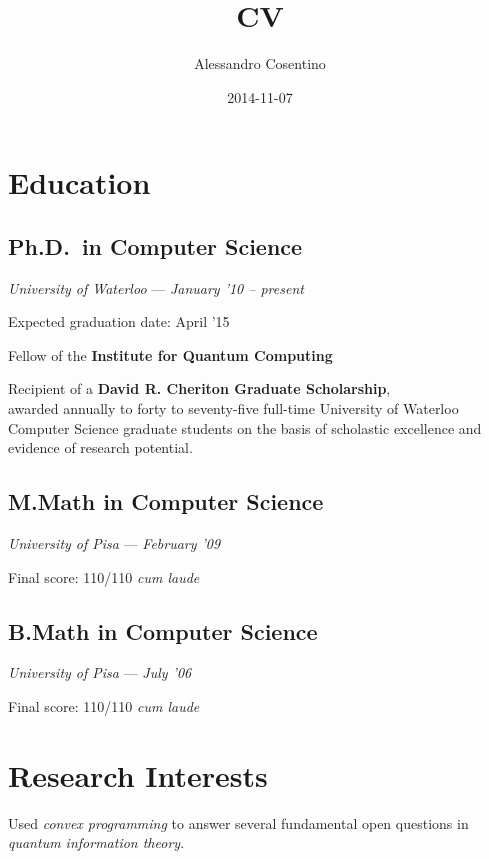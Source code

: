 \documentclass[]{article}
\title{CV}
\author{Alessandro Cosentino}
\date{2014-11-07}
\begin{document}
\maketitle
\thispagestyle{empty}

\section{Education}\label{education}

\subsection{Ph.D.~in Computer Science}\label{ph.d.in-computer-science}

\emph{University of Waterloo} --- \emph{January '10 -- present}

Expected graduation date: April '15

Fellow of the \textbf{Institute for Quantum Computing}

Recipient of a \textbf{David R. Cheriton Graduate Scholarship},\\awarded
annually to forty to seventy-five full-time University of Waterloo
Computer Science graduate students on the basis of scholastic excellence
and evidence of research potential.

\subsection{M.Math in Computer
Science}\label{m.math-in-computer-science}

\emph{University of Pisa} --- \emph{February '09}

Final score: 110/110 \emph{cum laude}

\subsection{B.Math in Computer
Science}\label{b.math-in-computer-science}

\emph{University of Pisa} --- \emph{July '06}

Final score: 110/110 \emph{cum laude}

\section{Research Interests}


Used \emph{convex programming} to answer several fundamental open
questions in \emph{quantum information theory}.
\end{document}

